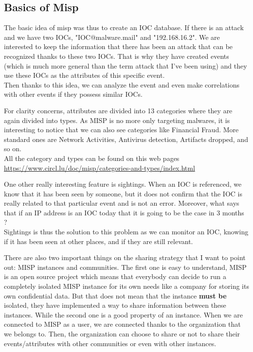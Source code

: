 \documentclass{eplmastersthesis}
\begin{document}
\subsection{Basics of Misp}
The basic idea of misp was thus to create an IOC database. If there is an attack and we have two IOCs, "IOC@malware.mail" and "192.168.16.2". We are interested to  keep the information that there has been an attack that can be recognized thanks to these two IOCs. That is why they have created events (which is much more general than the term attack that I've been using) and they use these IOCs as the attributes of this specific event. \\
Then thanks to this idea, we can analyze the event and even make correlations with other events if they possess similar IOCs.

For clarity concerns, attributes are divided into 13 categories where they are again divided into types. As MISP is no more only targeting malwares, it is interesting to notice that we can also see categories like Financial Fraud. More standard ones are Network Activities, Antivirus detection, Artifacts dropped, and so on.\\
All the category and types can be found on this web pages \url{https://www.circl.lu/doc/misp/categories-and-types/index.html}

One other really interesting feature is sightings. When an IOC is referenced, we know that it has been seen by someone, but it does not confirm that the IOC is really related to that particular event and is not an error. Moreover, what says that if an IP address is an IOC today that it is going to be the case in 3 months ? \\
Sightings is thus the solution to this problem as we can monitor an IOC, knowing if it has been seen at other places, and if they are still relevant.


There are also two important things on the sharing strategy that I want to point out: MISP instances and communities. The first one is easy to understand, MISP is an open source project which means that everybody can decide to run a completely isolated MISP instance for its own needs like a company for storing its own confidential data. But that does not mean that the instance \textbf{must be} isolated, they have implemented a way to share information between these instances. While the second one is a good property of an instance. When we are connected to MISP as a user, we are connected thanks to the organization that we belongs to. Then, the organization can choose to share or not to share their events/attributes with other communities or even with other instances. \\ 
\end{document}
